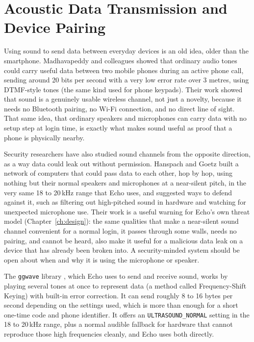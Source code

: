 \section{Acoustic Data Transmission and Device Pairing}
\label{sec:lit-acoustic}

Using sound to send data between everyday devices is an old idea, older
than the smartphone. Madhavapeddy and colleagues
\cite{madhavapeddy2005audio} showed that ordinary audio tones could carry
useful data between two mobile phones during an active phone call, sending
around 20 bits per second with a very low error rate over 3 metres, using
DTMF-style tones (the same kind used for phone keypads). Their work showed
that sound is a genuinely usable wireless channel, not just a novelty,
because it needs no Bluetooth pairing, no Wi-Fi connection, and no direct
line of sight. That same idea, that ordinary speakers and microphones can
carry data with no setup step at login time, is exactly what makes sound
useful as proof that a phone is physically nearby.

Security researchers have also studied sound channels from the opposite
direction, as a way data could leak out without permission. Hanspach and
Goetz \cite{hanspach2013covert} built a network of computers that could
pass data to each other, hop by hop, using nothing but their normal
speakers and microphones at a near-silent pitch, in the very same
18 to 20\,kHz range that Echo uses, and suggested ways to defend against it,
such as filtering out high-pitched sound in hardware and watching for
unexpected microphone use. Their work is a useful warning for Echo's own
threat model (Chapter~\ref{ch:design}): the same qualities that make a
near-silent sound channel convenient for a normal login, it passes through
some walls, needs no pairing, and cannot be heard, also make it useful for
a malicious data leak on a device that has already been broken into. A
security-minded system should be open about when and why it is using the
microphone or speaker.

The \texttt{ggwave} library \cite{ggwave}, which Echo uses to send and
receive sound, works by playing several tones at once to represent data
(a method called Frequency-Shift Keying) with built-in error correction.
It can send roughly 8 to 16 bytes per second depending on the settings used,
which is more than enough for a short one-time code and phone identifier.
It offers an \texttt{ULTRASOUND\_NORMAL} setting in the 18 to 20\,kHz range,
plus a normal audible fallback for hardware that cannot reproduce those
high frequencies cleanly, and Echo uses both directly.

